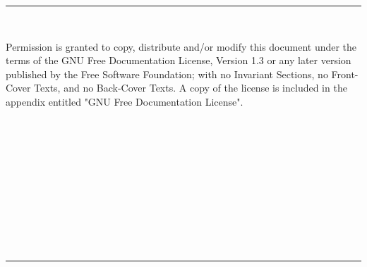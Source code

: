 

\thispagestyle{empty}
\cleardoublepage

\thispagestyle{empty}


\cleardoublepage
\thispagestyle{empty}
\noindent\rule[-1ex]{\textwidth}{2pt}\\[4.5ex]
\vfill

\vspace{.5cm}

\noindent Permission is granted to copy, distribute and/or modify this
document under the terms of the GNU Free Documentation License,
Version 1.3 or any later version published by the Free Software
Foundation; with no Invariant Sections, no Front-Cover Texts, and no
Back-Cover Texts.  A copy of the license is included in the appendix
entitled "GNU Free Documentation License".


\cleardoublepage
\thispagestyle{empty}
\begin{center}
{\large\bfseries \myTitle}\\
\end{center}
\begin{center}
\myName
\end{center}
\\
\vspace{0.7cm}

\\

\cleardoublepage
\thispagestyle{empty}
\begin{center}
{\large\bfseries \myTitle}\\
\end{center}
\begin{center}
\myName
\end{center}
\\
\vspace{0.7cm}

\\


\cleardoublepage
\thispagestyle{empty}
\noindent\rule[-1ex]{\textwidth}{2pt}\\[4.5ex]

